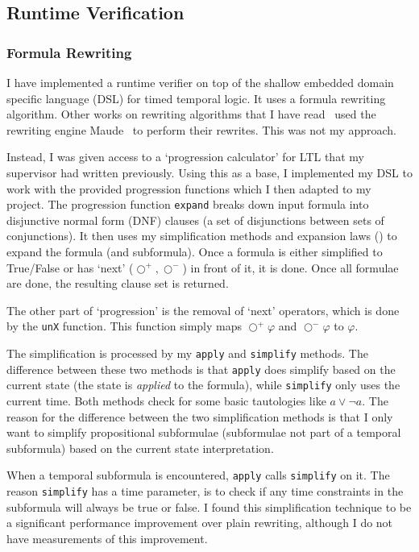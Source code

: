\documentclass[a4paper]{article}
\newcommand{\sn}{\bigcirc^+}
\newcommand{\wn}{\bigcirc^-}
\begin{document}
\subsection{Runtime Verification}
\subsubsection{Formula Rewriting}
I have implemented a runtime verifier on top of the shallow embedded domain specific language (DSL) for timed temporal logic. It uses a formula rewriting algorithm.
Other works on rewriting algorithms that I have read~\autocites{rosu2005rewriting,chai2013rewriting} used the rewriting engine Maude~\autocite{clavel2002maude} to perform their rewrites. This was not my approach.

Instead, I was given access to a `progression calculator' for LTL that my supervisor had written previously.
Using this as a base, I implemented my DSL to work with the provided progression functions which I then adapted to my project.
The progression function \texttt{expand} breaks down input formula into disjunctive normal form (DNF) clauses (a set of disjunctions between sets of conjunctions).
It then uses my simplification methods and expansion laws () to expand the formula (and subformula).
Once a formula is either simplified to True/False or has `next' ($\sn,\wn$) in front of it, it is done. Once all formulae are done, the resulting clause set is returned.

The other part of `progression' is the removal of `next' operators, which is done by the \texttt{unX} function. This function simply maps $\sn\varphi$ and $\wn\varphi$ to $\varphi$.

The simplification is processed by my \texttt{apply} and \texttt{simplify} methods.
The difference between these two methods is that \texttt{apply} does simplify based on the current state (the state is \emph{applied} to the formula), while \texttt{simplify} only uses the current time. Both methods check for some basic tautologies like $a\lor\neg a$.
The reason for the difference between the two simplification methods is that I only want to simplify propositional subformulae (subformulae not part of a temporal subformula) based on the current state interpretation.

When a temporal subformula is encountered, \texttt{apply} calls \texttt{simplify} on it.
The reason \texttt{simplify} has a time parameter, is to check if any time constraints in the subformula will always be true or false.
I found this simplification technique to be a significant performance improvement over plain rewriting, although I do not have measurements of this improvement.
\end{document}
